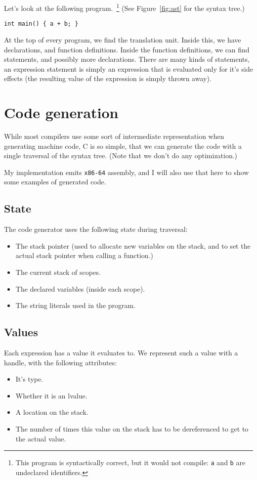 \documentclass[12pt]{article}
\begin{document}
Let's look at the following program.~\footnote{This program is syntactically
correct, but it would not compile: \texttt{a} and \texttt{b} are undeclared
identifiers.}
(See Figure~\ref{fig:ast} for the syntax tree.)
\begin{center}
\begin{BVerbatim}
int main() { a + b; }
\end{BVerbatim}
\end{center}

At the top of every program, we find the translation unit. Inside this, we have
declarations, and function definitions. Inside the function definitions, we can
find statements, and possibly more declarations. There are many kinds of
statements, an expression statement is simply an expression that is evaluated
only for it's side effects (the resulting value of the expression is simply
thrown away).

\section{Code generation}
While most compilers use some sort of intermediate representation when
generating machine code, C is so simple, that we can generate the code with a
single traversal of the syntax tree. (Note that we don't do any optimization.)

My implementation emits \texttt{x86-64} assembly, and I will also use that here
to show some examples of generated code.

\subsection{State}
The code generator uses the following state during traversal:
\begin{itemize}
	\item The stack pointer (used to allocate new variables on the stack,
		and to set the actual stack pointer when calling a function.)
	\item The current stack of scopes.
	\item The declared variables (inside each scope).
	\item The string literals used in the program.
\end{itemize}

\subsection{Values}
Each expression has a value it evaluates to. We represent such a value with a
handle, with the following attributes:
\begin{itemize}
	\item It's type.
	\item Whether it is an lvalue.
	\item A location on the stack.
	\item The number of times this value on the stack has to be
		dereferenced to get to the actual value.
\end{itemize}
\end{document}
